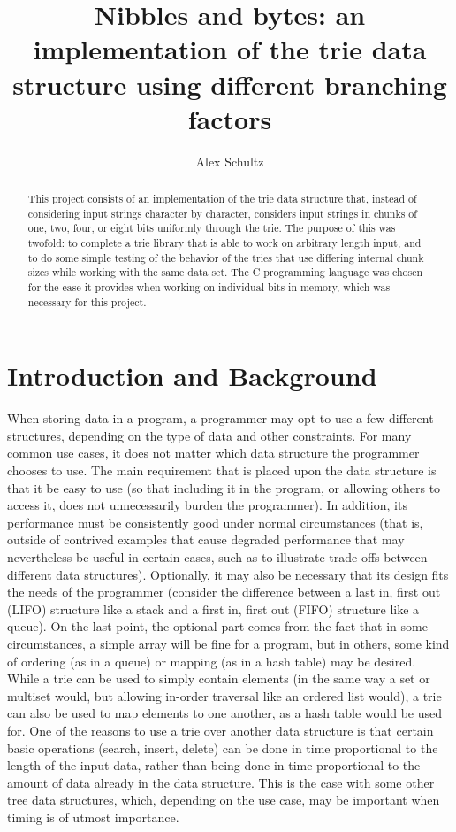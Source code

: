 \documentclass{llncs}
\title{Nibbles and bytes: an implementation of the trie data structure using different branching factors}
\author{Alex Schultz}
\institute{Tufts University}
\begin{document}
\maketitle

\begin{abstract}
This project consists of an implementation of the trie data structure that, instead of considering input strings character by character, considers input strings in chunks of one, two, four, or eight bits uniformly through the trie. The purpose of this was twofold: to complete a trie library that is able to work on arbitrary length input, and to do some simple testing of the behavior of the tries that use differing internal chunk sizes while working with the same data set. The C programming language was chosen for the ease it provides when working on individual bits in memory, which was necessary for this project.
\end{abstract}

\section{Introduction and Background}
\label{Introduction and Background}
When storing data in a program, a programmer may opt to use a few different structures, depending on the type of data and other constraints. For many common use cases, it does not matter which data structure the programmer chooses to use. The main requirement that is placed upon the data structure is that it be easy to use (so that including it in the program, or allowing others to access it, does not unnecessarily burden the programmer). In addition, its performance must be consistently good under normal circumstances (that is, outside of contrived examples that cause degraded performance that may nevertheless be useful in certain cases, such as to illustrate trade-offs between different data structures). Optionally, it may also be necessary that its design fits the needs of the programmer (consider the difference between a last in, first out (LIFO) structure like a stack and a first in, first out (FIFO) structure like a queue). On the last point, the optional part comes from the fact that in some circumstances, a simple array will be fine for a program, but in others, some kind of ordering (as in a queue) or mapping (as in a hash table) may be desired. \\

While a trie can be used to simply contain elements (in the same way a set or multiset would, but allowing in-order traversal like an ordered list would), a trie can also be used to map elements to one another, as a hash table would be used for. One of the reasons to use a trie over another data structure is that certain basic operations (search, insert, delete) can be done in time proportional to the length of the input data, rather than being done in time proportional to the amount of data already in the data structure. This is the case with some other tree data structures, which, depending on the use case, may be important when timing is of utmost importance. \\
\end{document}
